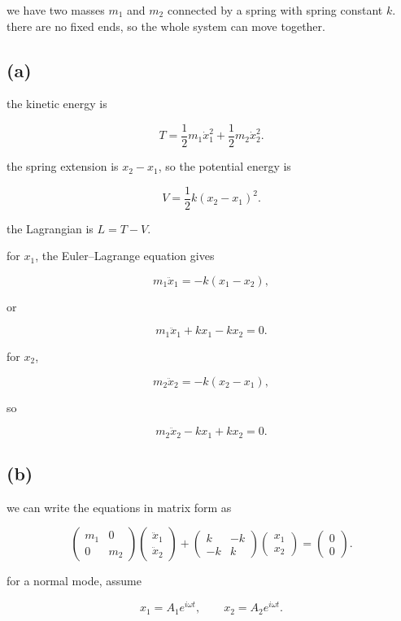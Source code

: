 \documentclass{article}
\begin{document}
we have two masses $m_1$ and $m_2$ connected by a spring with spring constant $k$. there are no fixed ends, so the whole system can move together.

\subsection*{(a)}

the kinetic energy is

\[
T=\frac{1}{2}m_1\dot{x}_1^2
+\frac{1}{2}m_2\dot{x}_2^2.
\]

the spring extension is $x_2-x_1$, so the potential energy is

\[
V=\frac{1}{2}k(x_2-x_1)^2.
\]

the Lagrangian is $L=T-V$.

for $x_1$, the Euler--Lagrange equation gives

\[
m_1\ddot{x}_1=-k(x_1-x_2),
\]

or

\[
\boxed{m_1\ddot{x}_1+kx_1-kx_2=0}.
\]

for $x_2$,

\[
m_2\ddot{x}_2=-k(x_2-x_1),
\]

so

\[
\boxed{m_2\ddot{x}_2-kx_1+kx_2=0}.
\]

\subsection*{(b)}

we can write the equations in matrix form as

\[
\begin{pmatrix}
m_1&0\\
0&m_2
\end{pmatrix}
\begin{pmatrix}
\ddot{x}_1\\
\ddot{x}_2
\end{pmatrix}
+
\begin{pmatrix}
k&-k\\
-k&k
\end{pmatrix}
\begin{pmatrix}
x_1\\
x_2
\end{pmatrix}
=
\begin{pmatrix}
0\\
0
\end{pmatrix}.
\]

for a normal mode, assume

\[
x_1=A_1e^{i\omega t},\qquad
x_2=A_2e^{i\omega t}.
\]
\end{document}
